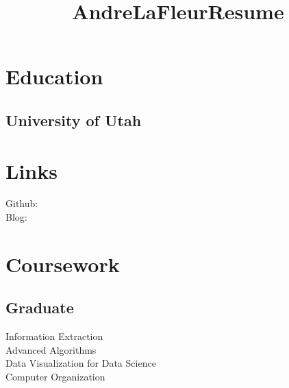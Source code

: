 \documentclass[]{resume-openfont}
\title{AndreLaFleurResume}
\begin{document}
%
%
\lastupdated

%
%



%
%

\begin{minipage}[t]{0.33\textwidth} 


\section{Education} 

\subsection{University of Utah}
\sectionsep


\section{Links} 
Github: \href{https://github.com/cincospenguinos}{} \\
Blog: \href{https://cincospenguinos.github.io/blog}{}
\sectionsep


\section{Coursework}
\subsection{Graduate}
Information Extraction \\
Advanced Algorithms \\
Data Visualization for Data Science \\
Computer Organization \\
\sectionsep


\end{minipage}
\end{document}
